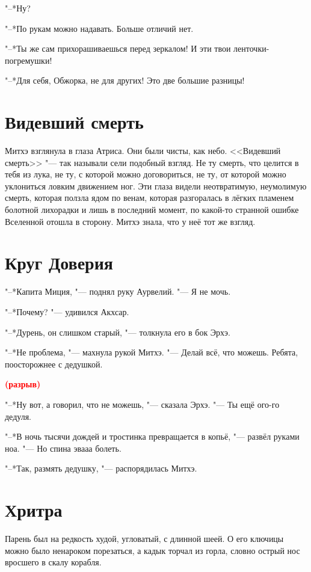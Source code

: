 \documentclass[a4paper,10pt]{book}
\newcommand{\ldotst}{\so{...}\xspace}
\newcommand{\spacing}{\textcolor{red}{\textbf{(разрыв)}}}
\begin{document}
"--*Ну?

"--*По рукам можно надавать. Больше отличий нет.

"--*Ты же сам прихорашиваешься перед зеркалом! И эти твои ленточки-погремушки!

"--*Для себя, Обжорка, не для других! Это две большие разницы!


\section{Видевший смерть}

Митхэ взглянула в глаза Атриса. Они были чисты, как небо. <<Видевший смерть>> 
"--- так называли сели подобный взгляд. Не ту смерть, что целится в тебя из 
лука, не ту, с которой можно договориться, не ту, от которой можно уклониться 
ловким движением ног. Эти глаза видели неотвратимую, неумолимую смерть, которая 
ползла ядом по венам, которая разгоралась в лёгких пламенем болотной лихорадки 
и 
лишь в последний момент, по какой-то странной ошибке Вселенной отошла в 
сторону. 
Митхэ знала, что у неё тот же взгляд.

\section{Круг Доверия}

"--*Капита Миция, "--- поднял руку Аурвелий. "--- Я не мочь.

"--*Почему? "--- удивился Акхсар.

"--*Дурень, он слишком старый, "--- толкнула его в бок Эрхэ.

"--*Не проблема, "--- махнула рукой Митхэ. "--- Делай всё, что можешь. Ребята, 
поосторожнее с дедушкой.

\spacing

"--*Ну вот, а говорил, что не можешь, "--- сказала Эрхэ. "--- Ты ещё ого-го 
дедуля.

"--*В ночь тысячи дождей и тростинка превращается в копьё, "--- развёл руками 
ноа. "---
Но спина\ldotst эвааа\ldotst болеть.

"--*Так, размять дедушку, "--- распорядилась Митхэ.

\section{Хритра}

Парень был на редкость худой, угловатый, с длинной шеей. О его ключицы можно было ненароком порезаться, а кадык торчал из горла, словно острый нос вросшего в скалу корабля.
\end{document}
